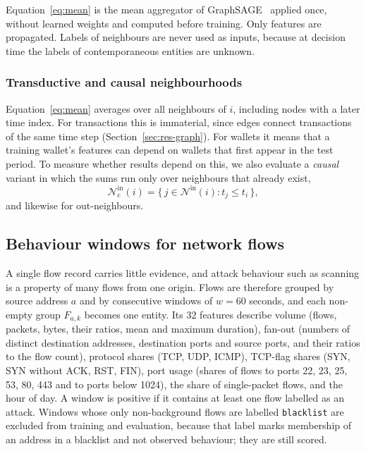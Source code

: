 Equation~\eqref{eq:mean} is the mean aggregator of GraphSAGE~\cite{hamilton2017} applied once, without learned weights and computed before training. Only features are propagated. Labels of neighbours are never used as inputs, because at decision time the labels of contemporaneous entities are unknown.

\subsubsection{Transductive and causal neighbourhoods} Equation~\eqref{eq:mean} averages over all neighbours of $i$, including nodes with a later time index. For transactions this is immaterial, since edges connect transactions of the same time step (Section~\ref{sec:res-graph}). For wallets it means that a training wallet's features can depend on wallets that first appear in the test period. To measure whether results depend on this, we also evaluate a \emph{causal} variant in which the sums run only over neighbours that already exist,
\begin{equation}\label{eq:causal}
\mathcal{N}^{\mathrm{in}}_{\mathrm{c}}(i) = \{\, j \in \mathcal{N}^{\mathrm{in}}(i) : t_j \le t_i \,\},
\end{equation}
and likewise for out-neighbours.

\subsection{Behaviour windows for network flows}\label{sec:method-net}
A single flow record carries little evidence, and attack behaviour such as scanning is a property of many flows from one origin. Flows are therefore grouped by source address $a$ and by consecutive windows of $w = 60$ seconds, and each non-empty group $F_{a,k}$ becomes one entity. Its 32 features describe volume (flows, packets, bytes, their ratios, mean and maximum duration), fan-out (numbers of distinct destination addresses, destination ports and source ports, and their ratios to the flow count), protocol shares (TCP, UDP, ICMP), TCP-flag shares (SYN, SYN without ACK, RST, FIN), port usage (shares of flows to ports 22, 23, 25, 53, 80, 443 and to ports below 1024), the share of single-packet flows, and the hour of day. A window is positive if it contains at least one flow labelled as an attack. Windows whose only non-background flows are labelled \texttt{blacklist} are excluded from training and evaluation, because that label marks membership of an address in a blacklist and not observed behaviour; they are still scored.

